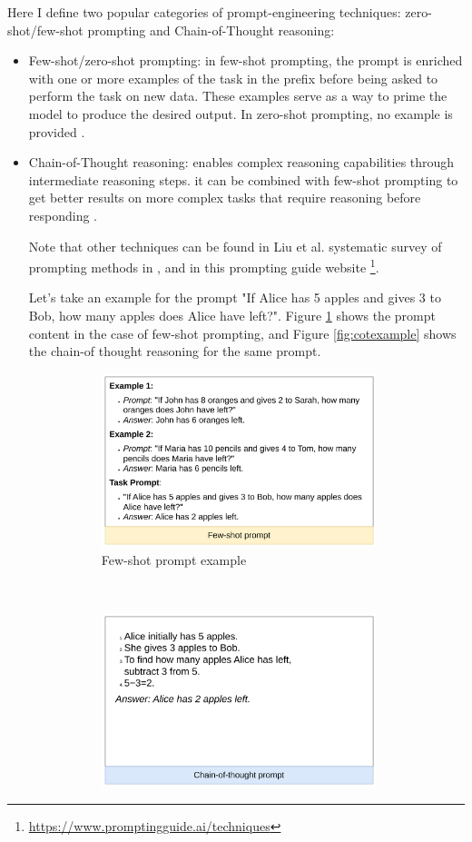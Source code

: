 Here I define two popular categories of prompt-engineering techniques: zero-shot/few-shot prompting and Chain-of-Thought reasoning:
\begin{itemize}
	\item Few-shot/zero-shot prompting: in few-shot prompting, the prompt is enriched with one or more examples of the task in the prefix before being asked to perform the task on new data. These examples serve as a way to prime the model to produce the desired output. In zero-shot prompting, no example is provided \cite{brown2020languagemodelsfewshotlearners,10.1145/3560815}.
	
	
	\item Chain-of-Thought reasoning: enables complex reasoning capabilities through intermediate reasoning steps. it can be combined with few-shot prompting to get better results on more complex tasks that require reasoning before responding \cite{10.5555/3600270.3602070}.
	
	Note that other techniques can be found in Liu et al. systematic survey of prompting methods in \cite{10.1145/3560815}, and in this prompting guide website \footnote{\url{https://www.promptingguide.ai/techniques}}.
	
	Let's take an example for the prompt "If Alice has 5 apples and gives 3 to Bob, how many apples does Alice have left?". Figure \ref{fig:fewshotexample} shows the prompt content in the case of few-shot prompting, and Figure \ref{fig:cotexample} shows the chain-of thought reasoning for the same prompt.
	
	
	\begin{figure}[t!]
		\centering
		\begin{subfigure}[t]{0.5\linewidth}
			\includegraphics[height=2in]{./pics/soaPics/fewshotpromtexample.png}
			\caption{Few-shot prompt example}
			\label{fig:fewshotexample}
		\end{subfigure}%
		~ 
		\begin{subfigure}[t]{0.5\linewidth}
			\includegraphics[height=2in]{ ./pics/soaPics/cotpromptexample.png }
		

\end{subfigure}
\end{figure}
\end{itemize}
